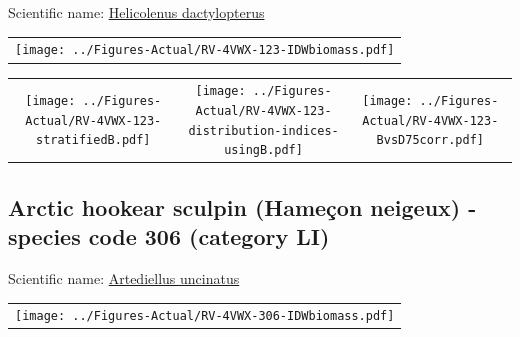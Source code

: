 \documentclass[12pt]{article}\usepackage[]{graphicx}\usepackage[]{color}
\begin{document}
  


Scientific name: \href{http://www.marinespecies.org/aphia.php?p=taxdetails\&id=127251}{Helicolenus dactylopterus} \newline
\begin{minipage}{1.0\textwidth}
 \begin{tabular}{c}
\texttt{[image: ../Figures-Actual/RV-4VWX-123-IDWbiomass.pdf]} \\ 
\end{tabular} 
\end{minipage}
\newline

\vspace{1cm}
\begin{minipage}{1.0\textwidth}
 \begin{tabular}{ccc}
\texttt{[image: ../Figures-Actual/RV-4VWX-123-stratifiedB.pdf]} & 
\texttt{[image: ../Figures-Actual/RV-4VWX-123-distribution-indices-usingB.pdf]} & 
\texttt{[image: ../Figures-Actual/RV-4VWX-123-BvsD75corr.pdf]} \\ 
\end{tabular} 
\end{minipage}
\clearpage

\renewcommand\thefigure{\thesubsection\Alph{figure}}

\setcounter{figure}{0}

\hypertarget{sec:306}{%
\subsection{Arctic hookear sculpin (Hameçon neigeux) - species code 306 (category LI)}\label{sec:306}}

  


Scientific name: \href{http://www.marinespecies.org/aphia.php?p=taxdetails\&id=127195}{Artediellus uncinatus} \newline
\begin{minipage}{1.0\textwidth}
 \begin{tabular}{c}
\texttt{[image: ../Figures-Actual/RV-4VWX-306-IDWbiomass.pdf]} \\ 
\end{tabular} 
\end{minipage}
\newline
\end{document}
